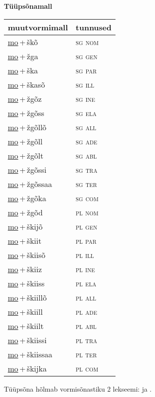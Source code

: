 
\vspace{1.8em}
\begin{minipage}{\textwidth}
\textbf{Tüüpsõnamall \,}\\

\begin{sideways}
\begin{tabular}{l l}
muutvormimall & tunnused \\
\hline
\underline{mo}\,+\,škõ & \textsc{ sg nom } \\
\underline{mo}\,+\,žga & \textsc{ sg gen } \\
\underline{mo}\,+\,ška & \textsc{ sg par } \\
\underline{mo}\,+\,škasõ & \textsc{ sg ill } \\
\underline{mo}\,+\,žgõz & \textsc{ sg ine } \\
\underline{mo}\,+\,žgõss & \textsc{ sg ela } \\
\underline{mo}\,+\,žgõllõ & \textsc{ sg all } \\
\underline{mo}\,+\,žgõll & \textsc{ sg ade } \\
\underline{mo}\,+\,žgõlt & \textsc{ sg abl } \\
\underline{mo}\,+\,žgõssi & \textsc{ sg tra } \\
\underline{mo}\,+\,žgõssaa & \textsc{ sg ter } \\
\underline{mo}\,+\,žgõka & \textsc{ sg com } \\
\underline{mo}\,+\,žgõd & \textsc{ pl nom } \\
\underline{mo}\,+\,škijõ & \textsc{ pl gen } \\
\underline{mo}\,+\,škiit & \textsc{ pl par } \\
\underline{mo}\,+\,škiisõ & \textsc{ pl ill } \\
\underline{mo}\,+\,škiiz & \textsc{ pl ine } \\
\underline{mo}\,+\,škiiss & \textsc{ pl ela } \\
\underline{mo}\,+\,škiillõ & \textsc{ pl all } \\
\underline{mo}\,+\,škiill & \textsc{ pl ade } \\
\underline{mo}\,+\,škiilt & \textsc{ pl abl } \\
\underline{mo}\,+\,škiissi & \textsc{ pl tra } \\
\underline{mo}\,+\,škiissaa & \textsc{ pl ter } \\
\underline{mo}\,+\,škijka & \textsc{ pl com } \\
\end{tabular}
\end{sideways}
\label{tab:tüüpsõnamall-moškõ}

\end{minipage}

 
\vspace{1em}
\noindent Tüüpsõna hõlmab vormisõnastiku 2 lekseemi:  ja .
